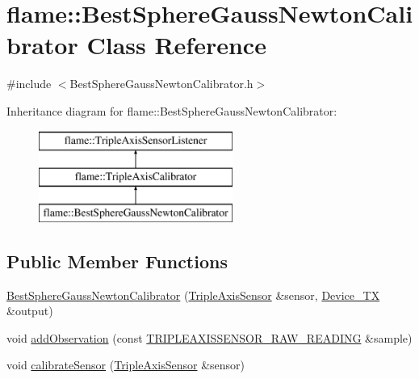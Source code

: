 \hypertarget{classflame_1_1_best_sphere_gauss_newton_calibrator}{\section{flame\-:\-:Best\-Sphere\-Gauss\-Newton\-Calibrator Class Reference}
\label{classflame_1_1_best_sphere_gauss_newton_calibrator}
}


{\ttfamily \#include $<$Best\-Sphere\-Gauss\-Newton\-Calibrator.\-h$>$}

Inheritance diagram for flame\-:\-:Best\-Sphere\-Gauss\-Newton\-Calibrator\-:\begin{figure}[H]
\begin{center}
\leavevmode
\includegraphics[height=3.000000cm]{classflame_1_1_best_sphere_gauss_newton_calibrator}
\end{center}
\end{figure}
\subsection*{Public Member Functions}
\begin{DoxyCompactItemize}
\item 
\hyperlink{classflame_1_1_best_sphere_gauss_newton_calibrator_a79df35e8eb4c6f1b88642302e46f13a6}{Best\-Sphere\-Gauss\-Newton\-Calibrator} (\hyperlink{classflame_1_1_triple_axis_sensor}{Triple\-Axis\-Sensor} \&sensor, \hyperlink{classflame_1_1_device___t_x}{Device\-\_\-\-T\-X} \&output)
\item 
void \hyperlink{classflame_1_1_best_sphere_gauss_newton_calibrator_af84f75dc992202bbd1b24624d3e22e28}{add\-Observation} (const \hyperlink{namespaceflame_ab883ad815041824ba548753dae327bc2}{T\-R\-I\-P\-L\-E\-A\-X\-I\-S\-S\-E\-N\-S\-O\-R\-\_\-\-R\-A\-W\-\_\-\-R\-E\-A\-D\-I\-N\-G} \&sample)
\item 
void \hyperlink{classflame_1_1_best_sphere_gauss_newton_calibrator_ac07439f912b1ff230dc3cc80c86c26be}{calibrate\-Sensor} (\hyperlink{classflame_1_1_triple_axis_sensor}{Triple\-Axis\-Sensor} \&sensor)
\end{DoxyCompactItemize}

